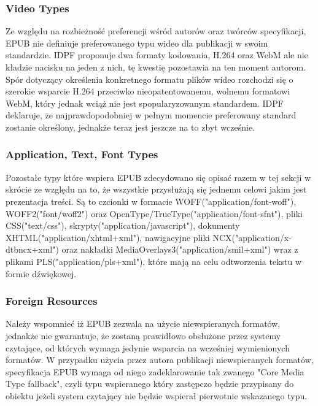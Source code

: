 \subsubsection*{Video Types}

Ze względu na rozbieżność preferencji wśród autorów oraz twórców specyfikacji, EPUB nie definiuje preferowanego typu wideo dla publikacji w swoim standardzie. IDPF proponuje dwa formaty kodowania, H.264 oraz WebM ale nie kładzie nacisku na jeden z nich, tę kwestię pozostawia na ten moment autorom. Spór dotyczący określenia konkretnego formatu plików wideo rozchodzi się o szerokie wsparcie H.264 przeciwko nieopatentowanemu, wolnemu formatowi WebM, który jednak wciąż nie jest spopularyzowanym standardem. IDPF deklaruje, że najprawdopodobniej w pełnym momencie preferowany standard zostanie określony, jednakże teraz jest jeszcze na to zbyt wcześnie\cite{WhatIsEPUB3Video}.

\subsubsection*{Application, Text, Font Types}

Pozostałe typy które wspiera EPUB zdecydowano się opisać razem w tej sekcji w skrócie ze względu na to, że wszystkie przysłużają się jednemu celowi jakim jest prezentacja treści. Są to czcionki w formacie WOFF("application/font-woff"), WOFF2("font/woff2") oraz OpenType/TrueType("application/font-sfnt"), pliki CSS("text/css"), skrypty("application/javascript"), dokumenty XHTML("application/xhtml+xml"), nawigacyjne pliki NCX("application/x-dtbncx+xml") oraz nakładki MediaOverlays3("application/smil+xml") wraz z plikami PLS("application/pls+xml"), które mają na celu odtworzenia tekstu w formie dźwiękowej\cite{EPUBCoreMediaTypes}.

\subsubsection*{Foreign Resources}

Należy wspomnieć iż EPUB zezwala na użycie niewspieranych formatów, jednakże nie gwarantuje, że zostaną prawidłowo obsłużone przez systemy czytające, od których wymaga jedynie wsparcia na wcześniej wymienionych formatów. W przypadku użycia przez autora publikacji niewspieranych formatów, specyfikacja EPUB wymaga od niego zadeklarowanie tak zwanego "Core Media Type fallback", czyli typu wspieranego który zastępczo będzie przypisany do obiektu jeżeli system czytający nie będzie wspierał pierwotnie wskazanego typu\cite{EPUBSpecificationForeignResources}.
